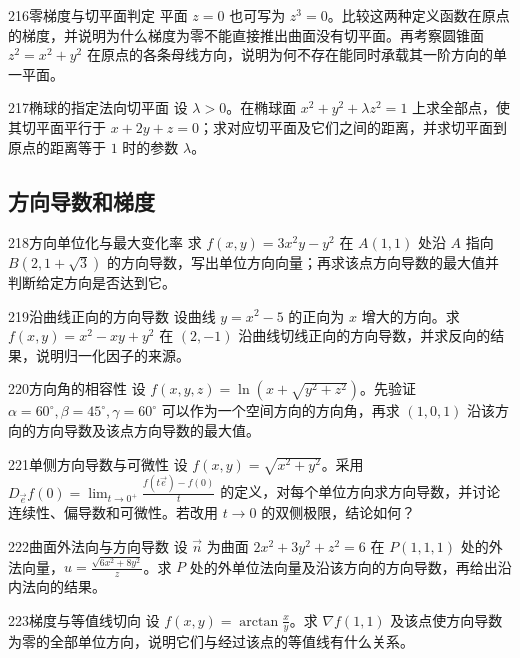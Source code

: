 \begin{exercise}{216}{零梯度与切平面判定}
平面 $z=0$ 也可写为 $z^3=0$。比较这两种定义函数在原点的梯度，并说明为什么梯度为零不能直接推出曲面没有切平面。再考察圆锥面 $z^2=x^2+y^2$ 在原点的各条母线方向，说明为何不存在能同时承载其一阶方向的单一平面。
\end{exercise}
\begin{exercise}{217}{椭球的指定法向切平面}
设 $\lambda>0$。在椭球面 $x^2+y^2+\lambda z^2=1$ 上求全部点，使其切平面平行于 $x+2y+z=0$；求对应切平面及它们之间的距离，并求切平面到原点的距离等于 $1$ 时的参数 $\lambda$。
\end{exercise}
\subsection{方向导数和梯度}
\begin{exercise}{218}{方向单位化与最大变化率}
求 $f(x,y)=3x^2y-y^2$ 在 $A(1,1)$ 处沿 $A$ 指向 $B(2,1+\sqrt3)$ 的方向导数，写出单位方向向量；再求该点方向导数的最大值并判断给定方向是否达到它。
\end{exercise}
\begin{exercise}{219}{沿曲线正向的方向导数}
设曲线 $y=x^2-5$ 的正向为 $x$ 增大的方向。求 $f(x,y)=x^2-xy+y^2$ 在 $(2,-1)$ 沿曲线切线正向的方向导数，并求反向的结果，说明归一化因子的来源。
\end{exercise}
\begin{exercise}{220}{方向角的相容性}
设 $f(x,y,z)=\ln(x+\sqrt{y^2+z^2})$。先验证 $\alpha=60^\circ,\beta=45^\circ,\gamma=60^\circ$ 可以作为一个空间方向的方向角，再求 $(1,0,1)$ 沿该方向的方向导数及该点方向导数的最大值。
\end{exercise}
\begin{exercise}{221}{单侧方向导数与可微性}
设 $f(x,y)=\sqrt{x^2+y^2}$。采用 $D_{\vec e}f(0)=\lim_{t\to0^+}\frac{f(t\vec e)-f(0)}t$ 的定义，对每个单位方向求方向导数，并讨论连续性、偏导数和可微性。若改用 $t\to0$ 的双侧极限，结论如何？
\end{exercise}
\begin{exercise}{222}{曲面外法向与方向导数}
设 $\vec n$ 为曲面 $2x^2+3y^2+z^2=6$ 在 $P(1,1,1)$ 处的外法向量，$u=\frac{\sqrt{6x^2+8y^2}}z$。求 $P$ 处的外单位法向量及沿该方向的方向导数，再给出沿内法向的结果。
\end{exercise}
\begin{exercise}{223}{梯度与等值线切向}
设 $f(x,y)=\arctan\frac xy$。求 $\nabla f(1,1)$ 及该点使方向导数为零的全部单位方向，说明它们与经过该点的等值线有什么关系。
\end{exercise}
